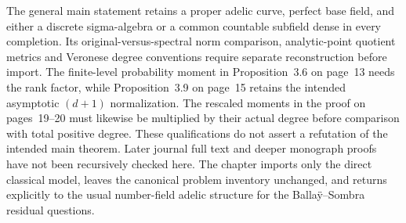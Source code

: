 The general main statement retains a proper adelic curve, perfect base
field, and either a discrete sigma-algebra or a common countable subfield
dense in every completion.  Its original-versus-spectral norm comparison,
analytic-point quotient metrics and Veronese degree conventions require
separate reconstruction before import.  The finite-level probability
moment in Proposition~3.6 on page~13 needs the rank factor, while
Proposition~3.9 on page~15 retains the intended asymptotic
$(d+1)$ normalization.  The rescaled moments in the proof on pages~19--20
must likewise be multiplied by their actual degree before comparison
with total positive degree.  These qualifications do not assert a
refutation of the intended main theorem.  Later journal full text and
deeper monograph proofs have not been recursively checked here.  The
chapter imports only the direct classical model, leaves the canonical
problem inventory unchanged, and returns explicitly to the usual
number-field adelic structure for the Balla\"y--Sombra residual questions.
